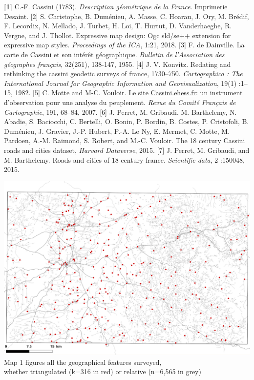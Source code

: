 \documentclass[portrait, A0]{sciposter}
\begin{document}
\begin{minipage}[b]{77cm}
\begin{multicols}{3}
\small
\textbf{[1]} C.-F. Cassini (1783). \textit{Description géométrique de la France}. Imprimerie Desaint.
[2] S. Christophe, B. Duménieu, A. Masse, C. Hoarau, J. Ory, M. Brédif, F. Lecordix, N. Mellado, J. Turbet, H. Loi, T. Hurtut, D. Vanderhaeghe, R. Vergne, and J. Thollot. Expressive map design: Ogc sld/se++ extension for expressive map styles. \textit{Proceedings of the ICA}, 1:21, 2018.
[3] F. de Dainville. La carte de Cassini et son intérêt géographique. \textit{Bulletin de l'Association des géographes français}, 32(251), 138-147, 1955.
[4] J. V. Konvitz. Redating and rethinking the cassini geodetic surveys of france, 1730–750. \textit{Cartographica : The International Journal for Geographic Information and Geovisualization}, 19(1) :1–15, 1982.
[5] C. Motte and M-C. Vouloir. Le site \href{http://cassini.ehess.fr}{Cassini.ehess.fr}: un instrument d’observation pour une analyse du peuplement. \textit{Revue du Comité Français de Cartographie}, 191, 68–84, 2007.
[6] J. Perret, M. Gribaudi, M. Barthelemy, N. Abadie, S. Baciocchi, C. Bertelli, O. Bonin, P. Bordin, B. Costes, P. Cristofoli, B. Duménieu, J. Gravier, J.-P. Hubert, P.-A. Le Ny, E. Mermet, C. Motte, M. Pardoen, A.-M. Raimond, S. Robert, and M.-C. Vouloir. The 18 century Cassini roads and cities dataset, \textit{Harvard Dataverse}, 2015.
[7] J. Perret, M. Gribaudi, and M. Barthelemy. Roads and cities of 18 century france. \textit{Scientific data}, 2 :150048, 2015.

\begin{center}
 \includegraphics[width=21cm]{gfx/Triangulated.png}
 \label{map:triangulated-relative}
 \vfill
  Map 1 figures all the geographical features surveyed,\\ whether triangulated (k=316 in red) or relative (n=6,565 in grey)
 \end{center}
 
\end{multicols}
\end{minipage}
\end{document}
